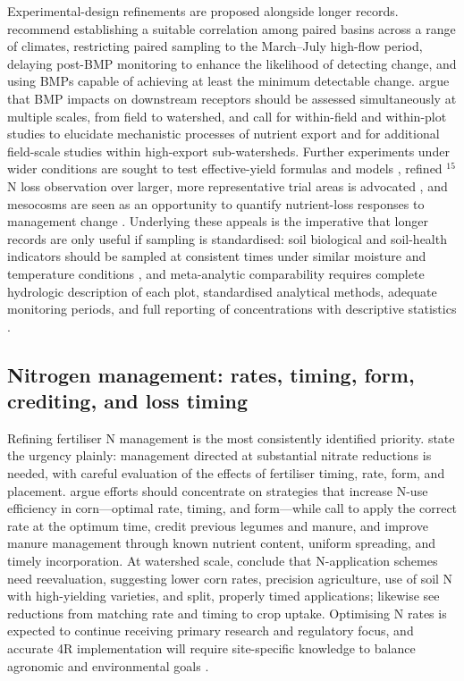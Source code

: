 \documentclass[11pt]{article}
\begin{document}
Experimental-design refinements are proposed alongside longer records. \textcite{Schilling2013} recommend establishing a suitable correlation among paired basins across a range of climates, restricting paired sampling to the March--July high-flow period, delaying post-BMP monitoring to enhance the likelihood of detecting change, and using BMPs capable of achieving at least the minimum detectable change. \textcite{Sunohara2016} argue that BMP impacts on downstream receptors should be assessed simultaneously at multiple scales, from field to watershed, and \textcite{Irvine2019} call for within-field and within-plot studies to elucidate mechanistic processes of nutrient export and for additional field-scale studies within high-export sub-watersheds. Further experiments under wider conditions are sought to test effective-yield formulas and models \parencite{Xin2016c}, refined $^{15}$N loss observation over larger, more representative trial areas is advocated \parencite{Xiong2025}, and mesocosms are seen as an opportunity to quantify nutrient-loss responses to management change \parencite{Loper2024}. Underlying these appeals is the imperative that longer records are only useful if sampling is standardised: soil biological and soil-health indicators should be sampled at consistent times under similar moisture and temperature conditions \parencite{Sherbine2023,Li2023b}, and meta-analytic comparability requires complete hydrologic description of each plot, standardised analytical methods, adequate monitoring periods, and full reporting of concentrations with descriptive statistics \parencite{Ghirardini2019}.

\subsection{Nitrogen management: rates, timing, form, crediting, and loss timing}

Refining fertiliser N management is the most consistently identified priority. \textcite{ROSSI1991} state the urgency plainly: management directed at substantial nitrate reductions is needed, with careful evaluation of the effects of fertiliser timing, rate, form, and placement. \textcite{Zhao2000} argue efforts should concentrate on strategies that increase N-use efficiency in corn---optimal rate, timing, and form---while \textcite{Randall2001} call to apply the correct rate at the optimum time, credit previous legumes and manure, and improve manure management through known nutrient content, uniform spreading, and timely incorporation. At watershed scale, \textcite{Dattamudi2020} conclude that N-application schemes need reevaluation, suggesting lower corn rates, precision agriculture, use of soil N with high-yielding varieties, and split, properly timed applications; \textcite{Elmi2002} likewise see reductions from matching rate and timing to crop uptake. Optimising N rates is expected to continue receiving primary research and regulatory focus, and accurate 4R implementation will require site-specific knowledge to balance agronomic and environmental goals \parencite{Christianson2015b}.
\end{document}
